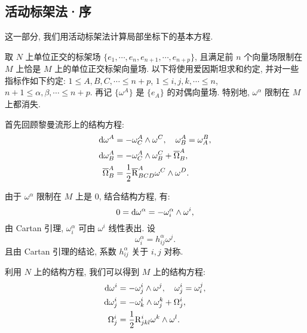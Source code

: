 \subsection{活动标架法·序}
这一部分, 我们用活动标架法计算局部坐标下的基本方程.

取 $N$ 上单位正交的标架场 $\{e_1, \cdots, e_n, e_{n + 1}, \cdots, e_{n + p}\}$, 且满足前 $n$ 个向量场限制在 $M$ 上恰是 $M$ 上的单位正交标架向量场. 以下将使用爱因斯坦求和约定, 并对一些指标作如下约定: $1 \leqslant A, B, C, \cdots \leqslant n + p$, $1 \leqslant i, j, k, \cdots \leqslant n$, $n + 1 \leqslant \alpha, \beta, \cdots \leqslant n + p$. 再记 $\{\omega^{A}\}$ 是 $\{e_{A}\}$ 的对偶向量场. 特别地, $\omega^\alpha$ 限制在 $M$ 上都消失.

首先回顾黎曼流形上的结构方程:
\begin{align*}
	\mathop{}\!\mathrm{d}\omega^{A} &= -\omega_{C}^{A} \wedge \omega^{C},\quad \omega^{A}_{B} = \omega^{B}_{A}, \\
	\mathop{}\!\mathrm{d}\omega^{A}_{B} &= -\omega^{A}_{C} \wedge \omega^{C}_{B} + \overline{\Omega}^{A}_{B}, \\
	\overline{\Omega}^{A}_{B} &= \frac{1}{2}\overline{\mathrm{R}}^{A}_{BCD}\omega^{C} \wedge \omega^{D}.
\end{align*}

由于 $\omega^{\alpha}$ 限制在 $M$ 上是 $0$, 结合结构方程, 有:
\[
	0 = \mathop{}\!\mathrm{d}\omega^{\alpha} = -\omega_{i}^{\alpha} \wedge \omega^{i},
\]
由 Cartan 引理, $\omega^{\alpha}_{i}$ 可由 $\omega^{i}$ 线性表出. 设 
\begin{equation}\label{eq::representation-connecxion-1-form}
	\omega^{\alpha}_{i} = h^{\alpha}_{ij}\omega^{j}.	
\end{equation}
且由 Cartan 引理的结论, 系数 $h^{\alpha}_{ij}$ 关于 $i, j$ 对称.

利用 $N$ 上的结构方程, 我们可以得到 $M$ 上的结构方程:
\begin{align*}
	\mathop{}\!\mathrm{d}\omega^{i} &= -\omega^{i}_{j} \wedge \omega^{j}, \quad \omega^{i}_{j} = \omega^{j}_{i}, \\
	\mathop{}\!\mathrm{d}\omega^{i}_{j} &= -\omega^{i}_{k} \wedge \omega^{k}_{j} + \Omega^{i}_{j}, \\
	\Omega^{i}_{j} &= \frac{1}{2}\mathrm{R}^{i}_{jkl}\omega^{k} \wedge \omega^{l}.
\end{align*}


